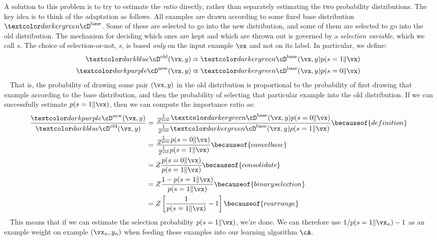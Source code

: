 A solution to this problem is to try to estimate the \emph{ratio} directly, rather than separately estimating the two probability distributions.
The key idea is to think of the adaptation as follows.
All examples are drawn according to some fixed base distribution $\Dbase$.
Some of these are selected to go into the new distribution, and some of them are selected to go into the old distribution.
The mechanism for deciding which ones are kept and which are thrown out is governed by a \emph{selection variable}, which we call $s$.
The choice of selection-or-not, $s$, is based \emph{only} on the input example $\vx$ and not on its label.
In particular, we define:
~
\begin{align}
\Dold(\vx,y) &\varpropto \Dbase(\vx,y) p(s=1 \| \vx) \\
\Dnew(\vx,y) &\varpropto \Dbase(\vx,y) p(s=0 \| \vx)
\end{align}
~
That is, the probability of drawing some pair $(\vx,y)$ in the old distribution is proportional to the probability of first drawing that example according to the base distribution, and then the probability of selecting that particular example into the old distribution.
If we can successfully estimate $p(s=1 \| \vx)$, then we can compute the importance ratio as:
~
\begin{align}
\frac {\Dnew(\vx,y)} {\Dold(\vx,y)}
&= \frac { \frac 1 {Z^{\text{new}}} \Dbase(\vx,y) p(s=0 \| \vx) }
         { \frac 1 {Z^{\text{old}}} \Dbase(\vx,y) p(s=1 \| \vx) }
  \becauseof{definition} \\
&= \frac { \frac 1 {Z^{\text{new}}} p(s=0 \| \vx) }
         { \frac 1 {Z^{\text{old}}} p(s=1 \| \vx) }
  \becauseof{cancel base} \\
&= Z \frac { p(s=0 \| \vx) } { p(s=1 \| \vx) }
  \becauseof{consolidate} \\
&= Z \frac { 1 - p(s=1 \| \vx) } { p(s=1 \| \vx) }
  \becauseof{binary selection} \\
&= Z \left[ \frac 1 {p(s=1 \| \vx)} - 1 \right]
  \becauseof{rearrange}
\end{align}
~
This means that if we can estimate the selection probability $p(s=1\|\vx)$, we're done.
We can therefore use $1 / p(s=1 \| \vx_n) - 1$ as an example weight on example $(\vx_n, y_n)$ when feeding these examples into our learning algorithm $\cA$.

